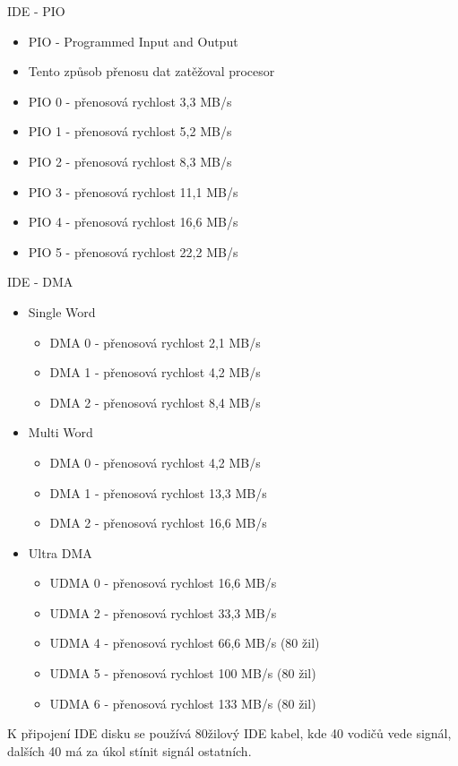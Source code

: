 \documentclass[aspectratio=43]{beamer}
\begin{document}
\begin{frame}{IDE - PIO}
	\begin{itemize}
		\item PIO - Programmed Input and Output
		\item Tento způsob přenosu dat zatěžoval procesor
	\end{itemize}
	\vfill
	\begin{itemize}
		\item PIO 0 - přenosová rychlost 3,3 MB/s 
		\item PIO 1 - přenosová rychlost 5,2 MB/s 
		\item PIO 2 - přenosová rychlost 8,3 MB/s 
		\item PIO 3 - přenosová rychlost 11,1 MB/s
		\item PIO 4 - přenosová rychlost 16,6 MB/s 
		\item PIO 5 - přenosová rychlost 22,2 MB/s
	\end{itemize}
\end{frame}


\begin{frame}{IDE - DMA}
	\begin{itemize}
		\item Single Word
		      \begin{itemize}
		      	\item DMA 0 - přenosová rychlost 2,1 MB/s 
		      	\item DMA 1 - přenosová rychlost 4,2 MB/s 
		      	\item DMA 2 - přenosová rychlost 8,4 MB/s  
		      \end{itemize}
		\item Multi Word
		      \begin{itemize}
		      	\item DMA 0 - přenosová rychlost 4,2 MB/s 
		      	\item DMA 1 - přenosová rychlost 13,3 MB/s 
		      	\item DMA 2 - přenosová rychlost 16,6 MB/s 
		      \end{itemize}
		\item Ultra DMA
		      \begin{itemize}
		      	\item UDMA 0 - přenosová rychlost 16,6 MB/s 
		      	\item UDMA 2 - přenosová rychlost 33,3 MB/s 
		      	\item UDMA 4 - přenosová rychlost 66,6 MB/s (80 žil)
		      	\item UDMA 5 - přenosová rychlost 100 MB/s (80 žil)
		      	\item UDMA 6 - přenosová rychlost 133 MB/s (80 žil)
		      \end{itemize}
	\end{itemize}
	
	K připojení IDE disku se používá 80žilový IDE kabel, kde 40 vodičů vede signál, dalších 40 má za úkol stínit signál ostatních.  
\end{frame}
\end{document}
